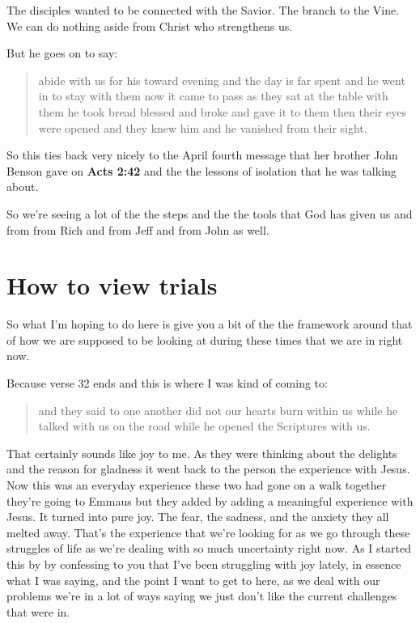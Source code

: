 \documentclass[11pt]{article} %
\begin{document}
The disciples wanted to be connected with the Savior. The branch to the Vine. We can do
nothing aside from Christ who strengthens us.

But he goes on to say:

\begin{quote}
abide with us for his toward evening and the day is far spent and he went in to stay with them now it
came to pass as they sat at the table with them he took bread blessed and broke and gave it to them
then their eyes were opened and they knew him and he vanished from their sight.
\end{quote}

So this ties back very nicely to the April fourth message that her brother John Benson gave on
\textbf{Acts 2:42} and the the lessons of isolation that he was talking about.

So we're seeing a lot of the the steps and the the tools that God has given us and from from Rich
and from Jeff and from John as well.

\section{How to view trials}

So what I'm hoping to do here is give you a bit of the the framework around that of how we are
supposed to be looking at during these times that we are in right now.

Because verse 32 ends and this is where I was kind of coming to:

\begin{quote}
and they said to one another did not our hearts burn within us while he talked with us on the road
while he opened the Scriptures with us.
\end{quote}

That certainly sounds like joy to me. As they were thinking about the delights and the reason for gladness
it went back to the person the experience with Jesus. Now this was an everyday experience these two had
gone on a walk together they're going to Emmaus but they added by adding a meaningful experience with
Jesus. It turned into pure joy. The fear, the sadness, and the anxiety they all melted away. That's the
experience that we're looking for as we go through these struggles of life as we're dealing with so much
uncertainty right now. As I started this by by confessing to you that I've been struggling with joy lately,
in essence what I was saying, and the point I want to get to here, as we deal with our problems we're
in a lot of ways saying we just don't like the current challenges that were in.
\end{document}
